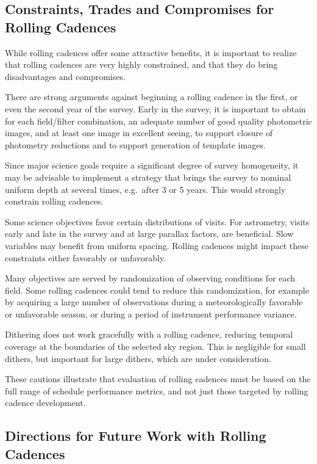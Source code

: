 
\subsection{Constraints, Trades and Compromises for Rolling Cadences}
\label{sec:rolling:trades}

While rolling cadences offer some attractive benefits, it is important
to realize that rolling cadences are very highly constrained, and that
they do bring disadvantages and compromises.

There are strong arguments against beginning a rolling cadence in the
first, or even the second year of the survey.  Early in the survey, it
is important to obtain for each field/filter combination, an adequate
number of good quality photometric images, and at least one image in
excellent seeing, to support closure of photometry reductions and to
support generation of template images.

Since major science goals require a significant degree of survey
homogeneity, it may be advisable to implement a strategy that brings the
survey to nominal uniform depth at several times, e.g.\ after 3 or 5
years.  This would strongly constrain rolling cadences.

Some science objectives favor certain distributions of visits.  For
astrometry, visits early and late in the survey and at large parallax
factors, are beneficial.  Slow variables may benefit from uniform
spacing.  Rolling cadences might impact these constraints either
favorably or unfavorably.

Many objectives are served by randomization of observing conditions for
each field.  Some rolling cadences could tend to reduce this
randomization, for example by acquiring a large number of observations
during a meteorologically favorable or unfavorable season, or during a
period of instrument performance variance.

Dithering does not work gracefully with a rolling cadence, reducing
temporal coverage at the boundaries of the selected sky region.  This is
negligible for small dithers, but important for large dithers, which are
under consideration.

These cautions illustrate that evaluation of rolling cadences must be
based on the full range of schedule performance metrics, and not just
those targeted by rolling cadence development.

\subsection{Directions for Future Work with Rolling Cadences}
\label{sec:rolling:directions}

